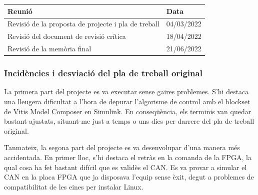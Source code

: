 {{\begin{table}[!htb]
            \begin{supertabular}{|m{10cm}|m{4cm}|}
                \hline
                    \textbf{Reunió} & \textbf{Data} \\
                \hline
                    { Revisió de la proposta de projecte i pla de treball }
                    & { 04/03/2022 } \\
                \hline
                    { Revisió del document de revisió crítica }
                    & { 18/04/2022 } \\
                \hline
                    { Revisió de la memòria final }
                    & { 21/06/2022 } \\
                \hline
            \end{supertabular}
        \end{table}
    }

    \subsubsection { Incidències i desviació del pla de treball original }
    {
        La primera part del projecte es va executar sense gaires problemes.
        S'hi destaca una lleugera dificultat a l'hora de depurar l'algorisme de
        control amb el blockset de Vitis Model Composer en Simulink. En
        conseqüència, els terminis van quedar bastant ajustats, situant-me
        just a temps o uns dies per darrere del pla de treball original.

        Tanmateix, la segona part del projecte es va desenvolupar d'una
        manera més accidentada. En primer lloc, s'hi destaca el retràs en la
        comanda de la FPGA, la qual cosa ha fet bastant difícil que es validès
        el CAN. Es va provar a simular el CAN en la placa FPGA que ja disposava
        l'equip sense èxit, degut a problemes de compatibilitat de les eines
        per instalar Linux.
    }
}

